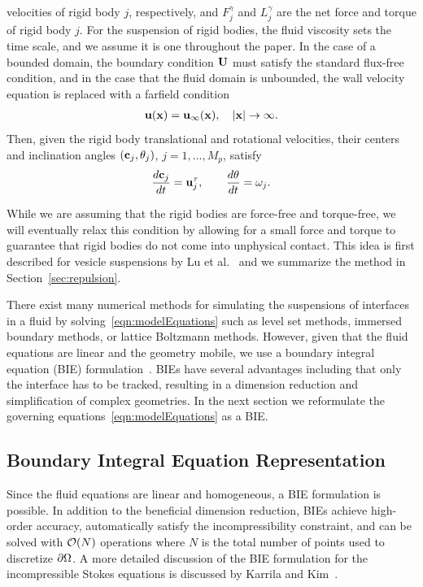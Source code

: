 \documentclass[preprint, 10pt]{elsarticle}
\begin{document}
velocities of rigid body $j$, respectively, and $F_j^\gamma$ and
$L_j^\gamma$ are the net force and torque of rigid body $j$.  For the
suspension of rigid bodies, the fluid viscosity sets the time scale, and
we assume it is one throughout the paper.  In the case of a bounded
domain, the boundary condition ${\mathbf{U}}$ must satisfy the standard flux-free
condition, and in the case that the fluid domain is unbounded, the wall
velocity equation is replaced with a farfield condition
\begin{align*}
  {\mathbf{u}}({\mathbf{x}}) = {\mathbf{u}}_\infty({\mathbf{x}}), \quad |{\mathbf{x}}| \rightarrow \infty.
\end{align*}
Then, given the rigid body translational and rotational velocities,
their centers and inclination angles $({\mathbf{c}}_j,\theta_j)$,
$j=1,\ldots,M_p$, satisfy
\begin{align*}
  \frac{d{\mathbf{c}}_j}{dt} = {\mathbf{u}}^\tau_j, \qquad 
  \frac{d\theta}{dt} = \omega_j.
\end{align*}

While we are assuming that the rigid bodies are force-free and
torque-free, we will eventually relax this condition by allowing for a
small force and torque to guarantee that rigid bodies do not come into
unphysical contact.  This idea is first described for vesicle
suspensions by Lu et al.~\cite{Lu2017} and we summarize the method in
Section~\ref{sec:repulsion}.  

There exist many numerical methods for simulating the suspensions of
interfaces in a fluid by solving~\eqref{eqn:modelEquations} such as
level set methods, immersed boundary methods, or lattice Boltzmann
methods.  However, given that the fluid equations are linear and the
geometry mobile, we use a boundary integral equation (BIE)
formulation~\cite{Pozrikidis1992}.  BIEs have several advantages
including that only the interface has to be tracked, resulting in a
dimension reduction and simplification of complex geometries.  In the
next section we reformulate the governing
equations~\eqref{eqn:modelEquations} as a BIE.

\subsection{Boundary Integral Equation Representation}
Since the fluid equations are linear and homogeneous, a BIE formulation
is possible.  In addition to the beneficial dimension reduction, BIEs
achieve high-order accuracy, automatically satisfy the incompressibility
constraint, and can be solved with ${\mathcal{O}}(N)$ operations where $N$ is
the total number of points used to discretize ${\partial}\Omega$.  A more
detailed discussion of the BIE formulation for the incompressible Stokes
equations is discussed by Karrila and Kim~\cite{Karrila1989}.
\end{document}

